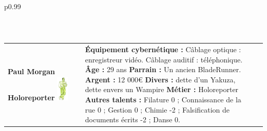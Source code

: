 \documentclass[11pt,twoside,a4paper]{article}
\begin{document}
\begin{longtable}[ht]{ p{} }
\begin{tabular}[h]{ p{} p{} p{} }
	\end{tabular} \newline \\
	
	
		\hline
	\begin{tabular}[h]{ p{} p{} p{} }
		\textbf{Paul Morgan}										\newline
		\textbf{\small Holoreporter}								\newline
			\newline
		\includegraphics[width=0.15\textwidth]{img/personnagePaulMorgan.jpg}		
			\newline
			
		& %
			
		\textbf{{\'E}quipement cybern{\'e}tique : }C{\^a}blage optique : enregistreur vid{\'e}o. C{\^a}blage auditif : t{\'e}l{\'e}phonique. \newline
		\textbf{{\^A}ge : } 29 ans 											\newline
		\textbf{Parrain : } Un ancien BladeRunner. 							\newline
		\textbf{Argent : } 12 000\euro 										\newline
		\textbf{Divers : } dette d'un Yakuza, dette envers un Wampire		\newline
		\textbf{M{\'e}tier : } Holoreporter									\newline
		\textbf{Autres talents : } Filature 0 ; Connaissance de la rue 0 ; Gestion 0 ; Chimie -2 ; Falsification de documents {\'e}crits -2 ; Danse 0. \newline
		

\end{tabular}
\end{longtable}
\end{document}
